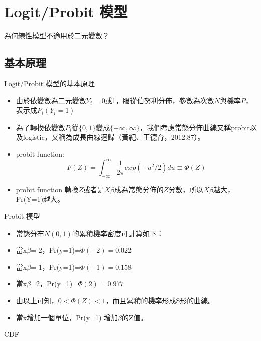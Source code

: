 \documentclass[border=10pt]{beamer}
\DeclareMathOperator{\CDF}{cdf}
\def\cdf(#1)(#2)(#3){0.5*(1+(erf((#1-#2)/(#3*sqrt(2)))))}%
\begin{document}
\section{Logit/Probit 模型}
\begin{frame}{為何線性模型不適用於二元變數？}
\begin{center}
\smartdiagram[descriptive diagram]{
  {Linearity, {Population means of the dependent variables at each level of the independent variable are not on a straight line}},
  {Variance,  {Variance of the errors are not constant}},
    {Errors,  {Errors are not normally distributed} }}
\end{center}
\end{frame}
\subsection{基本原理}
\begin{frame}{Logit/Probit 模型的基本原理}
\begin{itemize}
\item 由於依變數為二元變數$Y_{i}=0$或1，服從伯努利分佈，參數為次數$N$與機率$P$，表示成$P_{i}(Y_{i}=1)$
\item 為了轉換依變數$P_{i}$從$\{0, 1\}$變成$\{-\infty, \infty \}$，我們考慮常態分佈曲線又稱probit以及logistic，又稱為成長曲線迴歸（黃紀、王德育，2012:87）。
\item probit function: \[F(Z)=\int_{-\infty}^{\infty}\frac{1}{2\pi}exp(-u^2/2)du\equiv \Phi (Z)\]
\item probit function 轉換$Z$或者是$X\beta$成為常態分佈的$Z$分數，所以$X\beta$越大，Pr(Y=1)越大。
\end{itemize}
\end{frame}
\begin{frame}{Probit 模型}
\begin{itemize}
\item 常態分布$N(0, 1)$的累積機率密度可計算如下：
\item 當x$\beta$=-2，Pr(y=1)=$\Phi(-2)=0.022$
\item 當x$\beta$=-1，Pr(y=1)=$\Phi(-1)=0.158$
\item 當x$\beta$=2，Pr(y=1)=$\Phi(2)=0.977$
\item 由以上可知，$0<\Phi(Z)<1$，而且累積的機率形成S形的曲線。
\item 當x增加一個單位，Pr(y=1) 增加$\beta$的Z值。
\end{itemize}
\end{frame}
\begin{frame}{CDF}
\end{frame}
\end{document}
